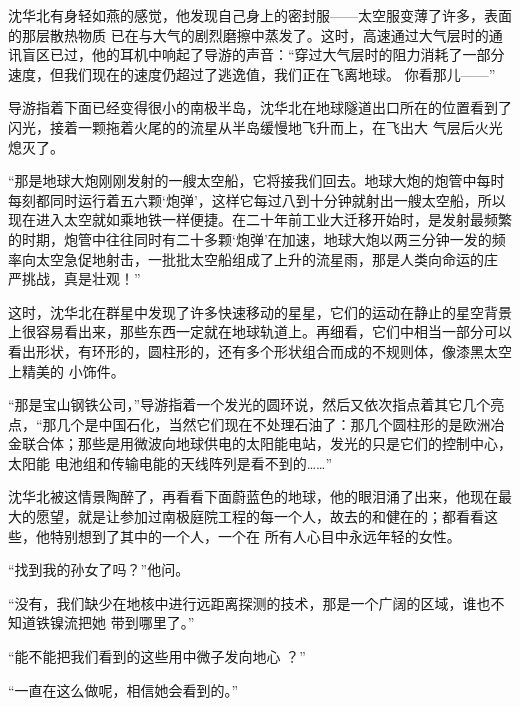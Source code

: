 \documentclass{article}
\begin{document}
沈华北有身轻如燕的感觉，他发现自己身上的密封服——太空服变薄了许多，表面的那层散热物质
\newpage
已在与大气的剧烈磨擦中蒸发了。这时，高速通过大气层时的通讯盲区已过，他的耳机中响起了导游的声音：“穿过大气层时的阻力消耗了一部分速度，但我们现在的速度仍超过了逃逸值，我们正在飞离地球。
你看那儿——” 

导游指着下面已经变得很小的南极半岛，沈华北在地球隧道出口所在的位置看到了闪光，接着一颗拖着火尾的的流星从半岛缓慢地飞升而上，在飞出大
气层后火光熄灭了。 

“那是地球大炮刚刚发射的一艘太空船，它将接我们回去。地球大炮的炮管中每时每刻都同时运行着五六颗‘炮弹’，这样它每过八到十分钟就射出一艘太空船，所以现在进入太空就如乘地铁一样便捷。在二十年前工业大迁移开始时，是发射最频繁的时期，炮管中往往同时有二十多颗‘炮弹’在加速，地球大炮以两三分钟一发的频率向太空急促地射击，一批批太空船组成了上升的流星雨，那是人类向命运的庄
严挑战，真是壮观！” 

\newpage

这时，沈华北在群星中发现了许多快速移动的星星，它们的运动在静止的星空背景上很容易看出来，那些东西一定就在地球轨道上。再细看，它们中相当一部分可以看出形状，有环形的，圆柱形的，还有多个形状组合而成的不规则体，像漆黑太空上精美的
小饰件。 

“那是宝山钢铁公司，”导游指着一个发光的圆环说，然后又依次指点着其它几个亮点，“那几个是中国石化，当然它们现在不处理石油了：那几个圆柱形的是欧洲冶金联合体；那些是用微波向地球供电的太阳能电站，发光的只是它们的控制中心，太阳能
电池组和传输电能的天线阵列是看不到的……” 

沈华北被这情景陶醉了，再看看下面蔚蓝色的地球，他的眼泪涌了出来，他现在最大的愿望，就是让参加过南极庭院工程的每一个人，故去的和健在的；都看看这些，他特别想到了其中的一个人，一个在
所有人心目中永远年轻的女性。 


\newpage

“找到我的孙女了吗？”他问。 

“没有，我们缺少在地核中进行远距离探测的技术，那是一个广阔的区域，谁也不知道铁镍流把她
带到哪里了。” 

“能不能把我们看到的这些用中微子发向地心
？” 

“一直在这么做呢，相信她会看到的。”
\end{document}
